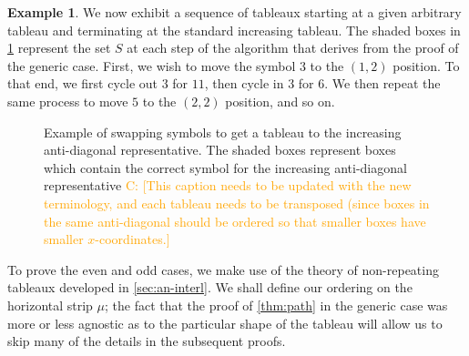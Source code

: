 \documentclass[11pt,reqno]{amsart}
\newcommand{\caelan}[1]{\textcolor{orange}{\sf C: [#1]}}
\theoremstyle{definition}
\theoremstyle{problem}
\newtheorem{example}[definition]{Example}
\theoremstyle{plain}
\theoremstyle{remark}
\theoremstyle{theorem}
\numberwithin{equation}{section}
\numberwithin{figure}{section}
\theoremstyle{definition}
\theoremstyle{problem}
\newtheorem{example}[definition]{Example}
\theoremstyle{plain}
\begin{document}
\begin{example}\label{ex:2}
  We now exhibit a sequence of tableaux starting at a given arbitrary
  tableau and terminating at the standard increasing tableau. The
  shaded boxes in \cref{fig:4} represent the set $S$ at each step of
  the algorithm that derives from the proof of the generic
  case. First, we wish to move the symbol $3$ to the $(1,2)$
  position. To that end, we first cycle out $3$ for $11$, then cycle
  in $3$ for $6$. We then repeat the same process to move $5$ to the
  $(2,2)$ position, and so on.
  \begin{figure}[H]
    
    \caption{Example of swapping symbols to get a tableau to the
      increasing anti-diagonal representative. The shaded boxes
      represent boxes which contain the correct symbol for the
      increasing anti-diagonal representative \caelan{This caption
        needs to be updated with the new terminology, and each tableau
        needs to be transposed (since boxes in the same anti-diagonal
        should be ordered so that smaller boxes have smaller
        $x$-coordinates.}}
  \label{fig:4}
  \end{figure}
\end{example}

To prove the even and odd cases, we make use of the theory of
non-repeating tableaux developed in \cref{sec:an-interl}.  We shall
define our ordering on the horizontal strip $\mu$; the fact that the
proof of \cref{thm:path} in the generic case was more or less agnostic
as to the particular shape of the tableau will allow us to skip many
of the details in the subsequent proofs.
\end{document}

